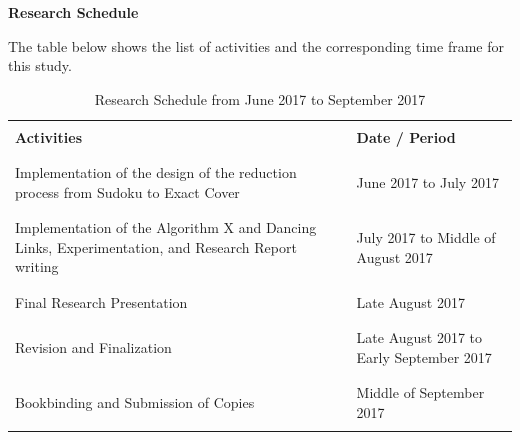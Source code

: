 \documentclass[a4paper,oneside,11pt]{report}
\begin{document}
\newpage
\begin{center}
\LARGE \hspace{2.5cm} \textbf{Research Schedule}
\newline
\end{center}

The table below shows the list of activities and the corresponding time frame for this study.
\begin{table}[!ht]
\begin{center}
\begin{tabular}{p{3.75in} | p{2in}}
\hline
&\\
\textbf{Activities} & \textbf{Date / Period}\\
&\\
\hline
\hline
&\\
Implementation of the design of the reduction process from Sudoku to Exact Cover & June 2017 to July 2017\\
&\\
\hline
&\\
Implementation of the Algorithm X and Dancing Links, Experimentation, and Research Report writing & July 2017 to Middle of August 2017\\
&\\
\hline
&\\
Final Research Presentation & Late August 2017\\
&\\
\hline
&\\
Revision and Finalization & Late August 2017 to Early September 2017\\
&\\
\hline
&\\
Bookbinding and Submission of Copies & Middle of September 2017\\
&\\
\hline
\end{tabular}
\end{center}
\caption{Research Schedule from June 2017 to September 2017}
\end{table}

\nocite{*}

\end{document}
